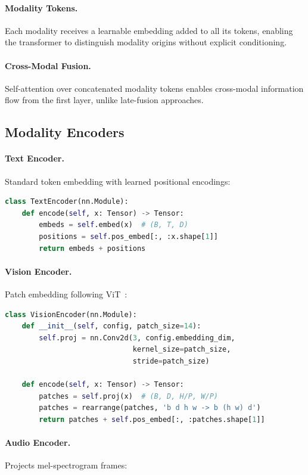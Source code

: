 \paragraph{Modality Tokens.} Each modality receives a learnable embedding added to all its tokens, enabling the transformer to distinguish modality origins without explicit conditioning.

\paragraph{Cross-Modal Fusion.} Self-attention over concatenated modality tokens enables cross-modal information flow from the first layer, unlike late-fusion approaches.

\subsection{Modality Encoders}

\paragraph{Text Encoder.} Standard token embedding with learned positional encodings:

\begin{lstlisting}[language=Python]
class TextEncoder(nn.Module):
    def encode(self, x: Tensor) -> Tensor:
        embeds = self.embed(x)  # (B, T, D)
        positions = self.pos_embed[:, :x.shape[1]]
        return embeds + positions
\end{lstlisting}

\paragraph{Vision Encoder.} Patch embedding following ViT~\cite{vit2020}:

\begin{lstlisting}[language=Python]
class VisionEncoder(nn.Module):
    def __init__(self, config, patch_size=14):
        self.proj = nn.Conv2d(3, config.embedding_dim,
                              kernel_size=patch_size,
                              stride=patch_size)

    def encode(self, x: Tensor) -> Tensor:
        patches = self.proj(x)  # (B, D, H/P, W/P)
        patches = rearrange(patches, 'b d h w -> b (h w) d')
        return patches + self.pos_embed[:, :patches.shape[1]]
\end{lstlisting}

\paragraph{Audio Encoder.} Projects mel-spectrogram frames:

